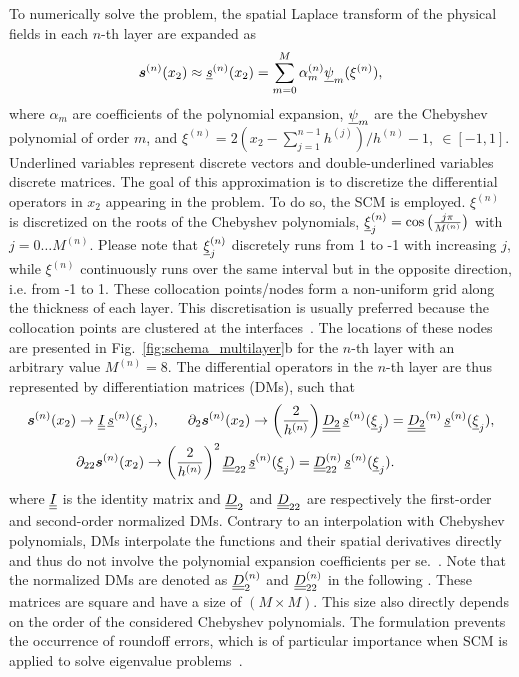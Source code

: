 To numerically solve the problem, the spatial Laplace transform of the physical fields in each $n$-th layer are expanded as
    \begin{equation}
        \boldsymbol s^{(n)}(x_2) \approx \underline{s}^{(n)}(x_2) = \sum_{m = 0}^M \alpha_m^{(n)} \underline{\psi}_m (\xi^{(n)}),
        \label{eq:field_to_polynomial}
    \end{equation}
    where $\alpha_m$ are coefficients of the polynomial expansion, $\underline{\psi}_m$ are the Chebyshev polynomial of order $m$, and $\xi^{(n)} = 2(x_2-\sum_{j=1}^{n-1}h^{(j)})/h^{(n)} - 1,~\in[-1,1]$. Underlined variables represent discrete vectors and double-underlined variables discrete matrices. The goal of this approximation is to discretize the differential operators in $x_2$ appearing in the problem. To do so, the SCM is employed. $\xi^{(n)}$ is discretized on the roots of the Chebyshev polynomials, $\underline{\xi}_j^{(n)} = \cos\left(\frac{j\pi}{M^{(n)}}\right)$ with $j=0\ldots M^{(n)}$. Please note that $\underline{\xi}_j^{(n)}$ discretely runs from 1 to -1 with increasing $j$, while $\xi^{(n)}$ continuously runs over the same interval but in the opposite direction, i.e. from -1 to 1. These collocation points/nodes form a non-uniform grid along the thickness of each layer. This discretisation is usually preferred because the collocation points are clustered at the interfaces~\cite{trefethen2000}. The locations of these nodes are presented in Fig.~\ref{fig:schema_multilayer}b for the $n$-th layer with an arbitrary value $M^{(n)}=8$. The differential operators in the $n$-th layer are thus represented by differentiation matrices (DMs), such that
    \begin{equation}
        \begin{aligned}
            \boldsymbol s^{(n)} (x_2) & \rightarrow \underline{\underline{I}} \,\underline{s}^{(n)} (\underline{\xi}_j), \quad \quad
            \partial_2 \boldsymbol s^{(n)} (x_2) \rightarrow \left( \frac{ 2}{ h^{(n)}} \right) \underline{\underline{ D_2}} \, \underline{s}^{(n)}(\underline{\xi}_j)= \underline{\underline{ D_2}}^{(n)} \, \underline{s}^{(n)}(\underline{\xi}_j), \\
            & \partial_{22} \boldsymbol s^{(n)} (x_2) \rightarrow \left( \frac{ 2}{ h^{(n)}} \right)^2 \underline{\underline{D}}_{22} \,\underline{s}^{(n)}(\underline{\xi}_j)= \underline{\underline{D}}_{22}^{(n)} \,\underline{s}^{(n)}(\underline{\xi}_j). \\
        \end{aligned}
        \label{eq:diff_matrices}
    \end{equation}
where $\underline{\underline{I}}$ is the identity matrix and $\underline{\underline{D}}_2$ and $\underline{\underline{D}}_{22}$ are respectively the first-order and second-order normalized DMs. Contrary to an interpolation with Chebyshev polynomials, DMs interpolate the functions and their spatial derivatives directly and thus do not involve the polynomial expansion coefficients per se.~\cite{weideman2000}. Note that the normalized DMs are denoted as $\underline{\underline{D}}_{2}^{(n)}$ and $\underline{\underline{D}}_{22}^{(n)}$ in the following . These matrices are square and have a size of $(M \times M)$. This size also directly depends on the order of the considered Chebyshev polynomials. The formulation prevents the occurrence of roundoff errors, which is of particular importance when SCM is applied to solve eigenvalue problems~\cite{baltensperger2003}.\\
    
